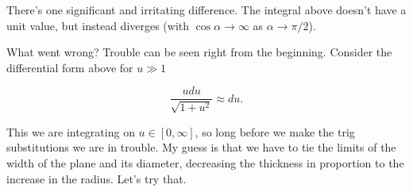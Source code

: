 There's one significant and irritating difference.  The integral above doesn't have a unit value, but instead diverges (with $\cos\alpha \rightarrow \infty$ as $\alpha \rightarrow \pi/2$).

What went wrong?  Trouble can be seen right from the beginning.  Consider the differential form above for $u \gg 1$

\begin{equation}\label{eqn:classicalMechanicsPs2:n}
\frac{u du}{\sqrt{1 + u^2}} \approx du.
\end{equation}

This we are integrating on $u \in [0, \infty]$, so long before we make the trig substitutions we are in trouble.  My guess is that we have to tie the limits of the width of the plane and its diameter, decreasing the thickness in proportion to the increase in the radius.  Let's try that.

\EndNoBibArticle
